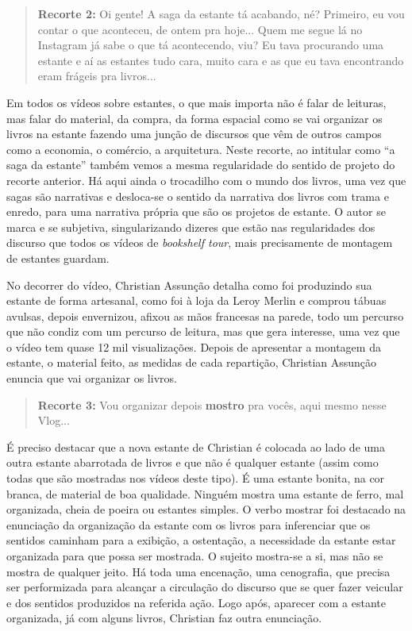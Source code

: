 \begin{quote}
\textbf{Recorte 2:}
Oi gente! A saga da estante tá acabando, né? Primeiro, eu vou contar o
que aconteceu, de ontem pra hoje... Quem me segue lá no Instagram
já sabe o que tá acontecendo, viu? Eu tava procurando uma estante e aí
as estantes tudo cara, muito cara e as que eu tava encontrando eram
frágeis pra livros...
\end{quote}

Em todos os vídeos sobre estantes, o que mais importa não é falar de
leituras, mas falar do material, da compra, da forma espacial como se
vai organizar os livros na estante fazendo uma junção de discursos que
vêm de outros campos como a economia, o comércio, a arquitetura. Neste
recorte, ao intitular como \enquote{a saga da estante} também vemos a mesma
regularidade do sentido de projeto do recorte anterior. Há aqui ainda o
trocadilho com o mundo dos livros, uma vez que sagas são narrativas e
desloca-se o sentido da narrativa dos livros com trama e enredo, para
uma narrativa própria que são os projetos de estante. O autor se marca e
se subjetiva, singularizando dizeres que estão nas regularidades dos
discurso que todos os vídeos de \textit{bookshelf tour}, mais precisamente
de montagem de estantes guardam.

No decorrer do vídeo, Christian Assunção detalha como foi produzindo sua
estante de forma artesanal, como foi à loja da Leroy Merlin e comprou
tábuas avulsas, depois envernizou, afixou as mãos francesas na parede,
todo um percurso que não condiz com um percurso de leitura, mas que gera
interesse, uma vez que o vídeo tem quase 12 mil visualizações. Depois de
apresentar a montagem da estante, o material feito, as medidas de cada
repartição, Christian Assunção enuncia que vai organizar os livros.

\begin{quote}
\textbf{Recorte 3:}
Vou organizar depois \textbf{mostro} pra vocês, aqui mesmo nesse
Vlog...  
\end{quote}


É preciso destacar que a nova estante de Christian é colocada ao lado de
uma outra estante abarrotada de livros e que não é qualquer estante
(assim como todas que são mostradas nos vídeos deste tipo). É uma
estante bonita, na cor branca, de material de boa qualidade. Ninguém
mostra uma estante de ferro, mal organizada, cheia de poeira ou estantes
simples. O verbo mostrar foi destacado na enunciação da organização da
estante com os livros para inferenciar que os sentidos caminham para a
exibição, a ostentação, a necessidade da estante estar organizada para
que possa ser mostrada. O sujeito mostra-se a si, mas não se mostra de
qualquer jeito. Há toda uma encenação, uma cenografia, que precisa ser
performizada para alcançar a circulação do discurso que se quer fazer
veicular e dos sentidos produzidos na referida ação. Logo após, aparecer
com a estante organizada, já com alguns livros, Christian faz outra
enunciação.

